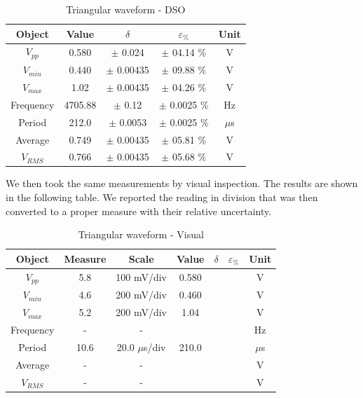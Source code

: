 \documentclass[../main.tex]{subfiles}
\begin{document}
\begin{table}[h!]
\centering	

\begin{tabular}{ccccc}
\textbf{Object} & \textbf{Value} & \textbf{$\delta$} & \textbf{$\varepsilon_{\%}$} &  \textbf{Unit} \\
\hline
 $V_{pp}$ & 0.580 & $\pm$ 0.024 & $\pm$ 04.14 \% &  V \\
 \hline
 $V_{min}$ & 0.440  & $\pm$ 0.00435 & $\pm$ 09.88 \% &  V \\
 \hline
 $V_{max}$ & 1.02  & $\pm$ 0.00435 & $\pm$ 04.26 \% &  V  \\
 \hline
 Frequency & 4705.88  & $\pm$ 0.12 & $\pm$ 0.0025 \% &  Hz \\
 \hline
 Period & 212.0 & $\pm$ 0.0053 & $\pm$ 0.0025 \%  &  $\mu$s \\
 \hline
 Average & 0.749  & $\pm$ 0.00435 & $\pm$  05.81 \% &  V \\ 
 \hline
 $V_{RMS}$ & 0.766 & $\pm$ 0.00435 & $\pm$ 05.68 \% &  V \\
 

\end{tabular}
\caption*{Triangular waveform - DSO}
\end{table}

We then took the same measurements by visual inspection. The results are shown in the following table. We reported the reading in division that was then converted to a proper measure with their relative uncertainty.

\begin{table}[h!]
\centering	

\begin{tabular}{ccccccc}
\textbf{Object} & \textbf{Measure} & \textbf{Scale}  & \textbf{Value}  & \textbf{$\delta$} & \textbf{$\varepsilon_{\%}$} & \textbf{Unit} \\
\hline
 $V_{pp}$ & 5.8 &  100 mV/div & 0.580 & &  & V \\
 \hline
 $V_{min}$ & 4.6  &  200 mV/div  & 0.460  &  & &  V \\
 \hline
 $V_{max}$ & 5.2 &  200 mV/div &  1.04 & &  & V  \\
 \hline
 Frequency & -  & -  &  &  &  & Hz \\
 \hline
 Period &  10.6 &  20.0 $\mu$s/div &  210.0 &  &   & $\mu$s \\
 \hline
 Average & - & - &   &   & &  V \\ 
 \hline
 $V_{RMS}$ & - & - &    &  &  & V \\
 

\end{tabular}
\caption*{Triangular waveform - Visual}
\end{table}
\end{document}
